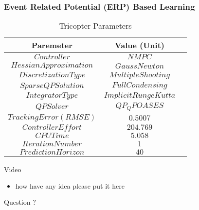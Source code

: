 \documentclass[13pt	]{beamer}
\begin{document}
\begin{frame}
\frametitle{Event Related Potential (ERP) Based Learning}
\begin{table}[h!] 
  \caption{Tricopter Parameters} 
\begin{center} 
\begin{tabular}{|c|c|c|} 
  \hline 
  Paremeter & Value (Unit) \\ 
  \hline
  $Controller$ & $NMPC$ \\ 
   \hline
  $Hessian Approximation$ & $Gauss Newton$ \\ 
   \hline
  $Discretization Type$ & $Multiple Shooting$ \\ 
   \hline
  $Sparse QP Solution$ & $Full Condensing$ \\ 
   \hline
  $Integrator Type$ & $Implicit Runge Kutta$ \\ 
   \hline 
  $QP Solver$ & $QP_QPOASES$ \\ 
   \hline 
  $Tracking Error (RMSE)$ & $0.5007$ \\ 
    \hline 
  $Controller Effort$ & $204.769$ \\ 
    \hline 
  $CPU Time$  & $5.058$  \\ 
    \hline 
  $Iteration Number$ & $1$ \\ 
    \hline 
  $Prediction Horizon$ & $40$  \\ 
    \hline 
\end{tabular} 
\end{center} 
\end{table}
\end{frame}

\begin{frame}
{Video}
\begin{itemize}

\item how have any idea please put it here 
\end{itemize}
\end{frame}


\begin{frame}
\begin{center}
Question ?
\end{center}
\end{frame}
\end{document}
